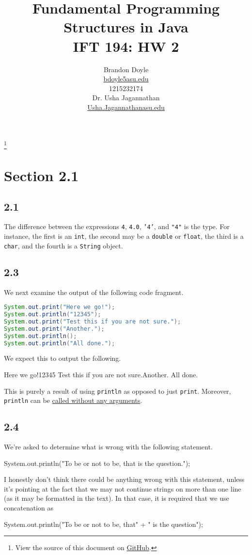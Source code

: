 \documentclass[leqno, 11pt]{article}
\title{\vspace{6ex}Fundamental Programming Structures in Java\\
  \Large IFT 194: HW 2}
\author{Brandon Doyle\\
\href{mailto:bdoyle@asu.edu}{bdoyle5\at{}asu.edu}\\
1215232174\\[1em]
Dr. Usha Jagannathan\\
\href{mailto:Usha.Jagannathan@asu.edu}{Usha.Jagannathan\at{}asu.edu}}
\newcommand\blfootnote[1]{%
  \begingroup
    \renewcommand\thefootnote{}\footnote{#1}
    \addtocounter{footnote}{-1}
  \endgroup
}
\begin{document}
\begin{titlepage}
\clearpage\maketitle
\thispagestyle{empty}
\end{titlepage}
\blfootnote{View the source of this document on \href{https://github.com/bjd2385/IFT_194_labs/blob/master/\jobname.tex}{GitHub}.}
\section*{Section 2.1}
\subsection*{2.1}
The difference between the expressions \texttt{4}, \texttt{4.0}, \texttt{'4'}, and \texttt{"4"} is the type. For instance, the first is an \texttt{int}, the second may be a \texttt{double} or \texttt{float}, the third is a \texttt{char}, and the fourth is a \texttt{String} object.
\subsection*{2.3}
We next examine the output of the following code fragment.
\begin{lstlisting}[language=java, xleftmargin=0.3\textwidth]
System.out.print("Here we go!");
System.out.println("12345");
System.out.print("Test this if you are not sure.");
System.out.print("Another.");
System.out.println();
System.out.println("All done.");
\end{lstlisting}
We expect this to output the following.
\begin{verbbox}
Here we go!12345
Test this if you are not sure.Another.
All done.
\end{verbbox}
\begin{center}
\theverbbox
\end{center}
This is purely a result of using \texttt{println} as opposed to just \texttt{print}. Moreover, \texttt{println} can be \href{https://docs.oracle.com/javase/10/docs/api/java/io/PrintStream.html#println()}{called without any arguments}.
\subsection*{2.4}
We're asked to determine what is wrong with the following statement.
\begin{verbbox}
System.out.println("To be or not to be, that is the question.");
\end{verbbox}
\begin{center}
\theverbbox
\end{center}
I honestly don't think there could be anything wrong with this statement, unless it's pointing at the fact that we may not continue strings on more than one line (as it may be formatted in the text). In that case, it is required that we use concatenation as
\begin{verbbox}
System.out.println("To be or not to be, that"
    + " is the question");
\end{verbbox}
\begin{center}
\theverbbox
\end{center}
\end{document}
